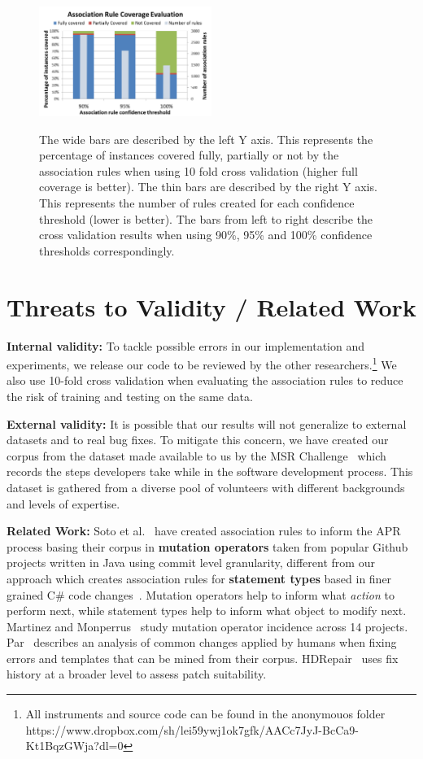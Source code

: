 \documentclass[sigconf]{acmart}
\begin{document}
\begin{figure}[h]
\caption{The wide bars are described by the left Y axis. This represents
the percentage of instances covered
fully, partially or not by the association rules when using 10 fold
cross validation (higher full coverage is better). 
The thin bars are described by the right Y axis.
This represents the number of rules created for each confidence threshold 
(lower is better).
The bars from left to right describe the cross validation
results when using 90\%, 95\% and 100\% confidence thresholds correspondingly.}
\centering
\includegraphics[width=0.5\textwidth]{images/assocRuleEval.png}
\label{ruleEvaluation}
\end{figure}

\section{Threats to Validity / Related Work} \label{threatsVal}

\noindent\textbf{Internal validity:}
To tackle possible errors in our implementation and experiments, we release our code
to be reviewed by the other researchers.\footnote{All instruments
and source code can be found in the anonymouos folder 
https://www.dropbox.com/sh/lei59ywj1ok7gfk/AACc7JyJ-BcCa9-Kt1BqzGWja?dl=0} 
We also use 10-fold cross validation 
when evaluating the association rules
to reduce the risk of training and testing on the same data.  

\noindent\textbf{External validity:} 
It is possible 
that our results will not generalize to external datasets and to
real bug fixes. To mitigate this concern, we have created our corpus 
from the dataset made available to us by the MSR Challenge~\cite{msr18challenge}
which records the steps developers take while in the software development process.
This dataset is gathered from a diverse pool of volunteers with different 
backgrounds and levels of expertise.

\noindent\textbf{Related Work:} 
Soto et al.~\cite{Soto18} have created association rules to inform the APR
process basing their corpus in \textbf{mutation operators} taken from popular Github projects
written in Java using commit level granularity, 
different from our approach which creates association rules for \textbf{statement types} 
based in finer grained C\# code changes~\cite{msr18challenge}. Mutation operators help to 
inform what \textit{action} to perform next, while statement types help to inform what
object to modify next. 
Martinez and
Monperrus~\cite{martinez15} study mutation operator incidence across 
14 projects. Par~\cite{kim2013} describes an analysis of common changes
applied by humans when fixing errors and templates that can be mined from
their corpus. HDRepair~\cite{xuan16} 
uses fix history at a broader level
to assess patch suitability.
\end{document}
